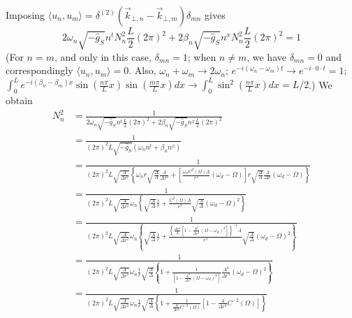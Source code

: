 \documentclass[english]{article}
\begin{document}
 Imposing $\langle u_{n},u_{m}\rangle=\delta^{(2)}\left(\vec{k}_{\bot,n}-\vec{k}_{\bot,m}\right)\delta_{mn}$
gives 
\[
2\omega_{n}\sqrt{-\hat{g}_{S}}n^{t}N^{2}_{n}\frac{L}{2}\left(2\pi\right)^{2}+2\beta_{n}\sqrt{-\hat{g}_{S}}n^{x}N^{2}_{n}\frac{L}{2}\left(2\pi\right)^{2}=1
\]
 (For $n=m$, and only in this case, $\delta_{mn}=1$; when $n\neq m$,
we have $\delta_{mn}=0$ and correspondingly $\langle u_{n},u_{m}\rangle=0$.
Also, $\omega_{n}+\omega_{m}\rightarrow2\omega_{n}$; $e^{-i\left(\omega_{n}-\omega_{m}\right)t}\rightarrow e^{-i\cdot0\cdot t}=1$;
$\int^{L}_{0}e^{-i\left(\beta_{n}-\beta_{m}\right)x}\sin\left(\frac{n\pi}{L}x\right)\sin\left(\frac{m\pi}{L}x\right)dx\rightarrow\int^{L}_{0}\sin^{2}\left(\frac{n\pi}{L}x\right)dx=L/2$.)
We obtain 
\begin{align*}
N^{2}_{n} & =\frac{1}{2\omega_{n}\sqrt{-\hat{g}_{S}}n^{t}\frac{L}{2}\left(2\pi\right)^{2}+2\beta_{n}\sqrt{-\hat{g}_{S}}n^{x}\frac{L}{2}\left(2\pi\right)^{2}}\\
 & =\frac{1}{\left(2\pi\right)^{2}L\sqrt{-\hat{g}_{S}}\left(\omega_{n}n^{t}+\beta_{n}n^{x}\right)}\\
 & =\frac{1}{\left(2\pi\right)^{2}L\sqrt{\frac{A}{\Delta r^{2}}}\left\{ \omega_{n}r\sqrt{\frac{\Delta}{A}}\frac{A}{\Delta r^{2}}+\left[\frac{\omega_{n}C^{2}\left(\Omega\right)A}{r^{3}}\left(\omega_{d}-\Omega\right)\right]r\sqrt{\frac{\Delta}{A}}\frac{A}{\Delta r}\left(\omega_{d}-\Omega\right)\right\} }\\
 & =\frac{1}{\left(2\pi\right)^{2}L\sqrt{\frac{A}{\Delta r^{2}}}\omega_{n}\left\{ \sqrt{\frac{A}{\Delta}}\frac{1}{r}+\frac{C^{2}\left(\Omega\right)A}{r^{3}}\sqrt{\frac{A}{\Delta}}\left(\omega_{d}-\Omega\right)^{2}\right\} }\\
 & =\frac{1}{\left(2\pi\right)^{2}L\sqrt{\frac{A}{\Delta r^{2}}}\omega_{n}\left\{ \sqrt{\frac{A}{\Delta}}\frac{1}{r}+\frac{\left\{ \frac{\Delta r^{2}}{A}\left[1-\frac{A^{2}}{\Delta r^{4}}\left(\Omega-\omega_{d}\right)^{2}\right]\right\} ^{-1}A}{r^{3}}\sqrt{\frac{A}{\Delta}}\left(\omega_{d}-\Omega\right)^{2}\right\} }\\
 & =\frac{1}{\left(2\pi\right)^{2}L\sqrt{\frac{A}{\Delta r^{2}}}\omega_{n}\frac{1}{r}\sqrt{\frac{A}{\Delta}}\left\{ 1+\frac{1}{\left[1-\frac{A^{2}}{\Delta r^{4}}\left(\Omega-\omega_{d}\right)^{2}\right]}\frac{A^{2}}{\Delta r^{4}}\left(\omega_{d}-\Omega\right)^{2}\right\} }\\
 & =\frac{1}{\left(2\pi\right)^{2}L\sqrt{\frac{A}{\Delta r^{2}}}\omega_{n}\frac{1}{r}\sqrt{\frac{A}{\Delta}}\left\{ 1+\frac{1}{\frac{A}{\Delta r^{2}}C^{-2}\left(\Omega\right)}\left[1-\frac{A}{\Delta r^{2}}C^{-2}\left(\Omega\right)\right]\right\} }\\

\end{align*}
\end{document}
